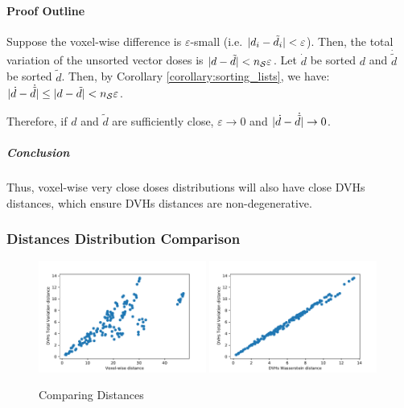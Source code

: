 \paragraph{Proof Outline}
Suppose the voxel-wise difference is $\varepsilon$-small (i.e. $|{d_i-\tilde{d}_i}| < \varepsilon$).
Then, the total variation of the unsorted vector doses is $|{d-\tilde{d}}| < n_\mathcal{S} \varepsilon$.
Let $\dot{d}$ be sorted $d$ and $\dot{\tilde{d}}$ be sorted $\tilde{d}$.
Then, by Corollary \ref{corollary:sorting_lists}, we have:
$|{\dot{d}-\dot{\tilde{d}}}| \leq |{d-\tilde{d}}| < n_\mathcal{S} \varepsilon$.

Therefore, if $d$ and $\tilde{d}$ are sufficiently close, $\varepsilon \to 0$ and $|{\dot{d}-\dot{\tilde{d}}}| \to 0$.

\subparagraph{Conclusion}
Thus, voxel-wise very close doses distributions will also have close DVHs distances, which ensure DVHs distances are non-degenerative.

\subsubsection{Distances Distribution Comparison}
\begin{figure}
	\centering
	\includegraphics[width=0.49\textwidth]{dose_distances_figures/TotalVariation-Voxelwise.pdf}		\includegraphics[width=0.49\textwidth]{dose_distances_figures/TotalVariation-Wasserstein.pdf}
	\caption{Comparing Distances}
\end{figure}

